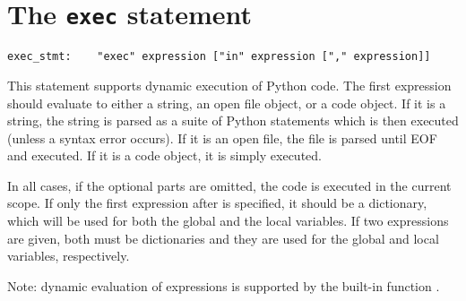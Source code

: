 \section{The {\tt exec} statement} \label{exec}

\begin{verbatim}
exec_stmt:    "exec" expression ["in" expression ["," expression]]
\end{verbatim}

This statement supports dynamic execution of Python code.  The first
expression should evaluate to either a string, an open file object, or
a code object.  If it is a string, the string is parsed as a suite of
Python statements which is then executed (unless a syntax error
occurs).  If it is an open file, the file is parsed until EOF and
executed.  If it is a code object, it is simply executed.

In all cases, if the optional parts are omitted, the code is executed
in the current scope.  If only the first expression after \verb@in@ is
specified, it should be a dictionary, which will be used for both the
global and the local variables.  If two expressions are given, both
must be dictionaries and they are used for the global and local
variables, respectively.

Note: dynamic evaluation of expressions is supported by the built-in
function \verb@eval@.

